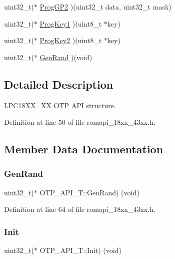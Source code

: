 \begin{DoxyCompactItemize}
\item 
uint32\+\_\+t($\ast$ \hyperlink{struct_o_t_p___a_p_i___t_a55d84ea55b3a819a959a363a5c0e076d}{Prog\+G\+P2} )(uint32\+\_\+t data, uint32\+\_\+t mask)
\item 
uint32\+\_\+t($\ast$ \hyperlink{struct_o_t_p___a_p_i___t_a95677013329707968a4eddb5c8ae5ca6}{Prog\+Key1} )(uint8\+\_\+t $\ast$key)
\item 
uint32\+\_\+t($\ast$ \hyperlink{struct_o_t_p___a_p_i___t_a8a8db3961e83c411289cd796bb9d3d17}{Prog\+Key2} )(uint8\+\_\+t $\ast$key)
\item 
uint32\+\_\+t($\ast$ \hyperlink{struct_o_t_p___a_p_i___t_adc7e56e6780a21840ca4f9e4e9caba91}{Gen\+Rand} )(void)
\end{DoxyCompactItemize}


\subsection{Detailed Description}
L\+P\+C18\+X\+X\+\_\+XX O\+TP A\+PI structure. 

Definition at line 50 of file romapi\+\_\+18xx\+\_\+43xx.\+h.



\subsection{Member Data Documentation}
\mbox{\label{struct_o_t_p___a_p_i___t_adc7e56e6780a21840ca4f9e4e9caba91}} 
\subsubsection{\texorpdfstring{Gen\+Rand}{GenRand}}
{\footnotesize\ttfamily uint32\+\_\+t($\ast$ O\+T\+P\+\_\+\+A\+P\+I\+\_\+\+T\+::\+Gen\+Rand) (void)}



Definition at line 64 of file romapi\+\_\+18xx\+\_\+43xx.\+h.

\mbox{\label{struct_o_t_p___a_p_i___t_ae3ce2662765ced30b77691a783595f2e}} 
\subsubsection{\texorpdfstring{Init}{Init}}
{\footnotesize\ttfamily uint32\+\_\+t($\ast$ O\+T\+P\+\_\+\+A\+P\+I\+\_\+\+T\+::\+Init) (void)}

